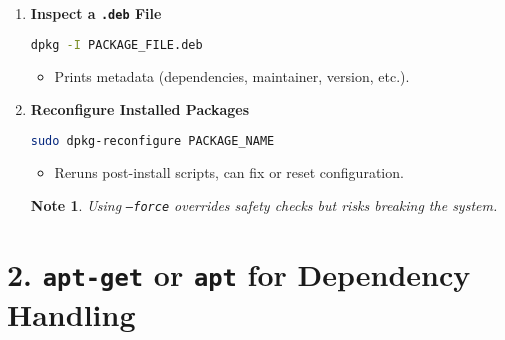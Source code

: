 \documentclass[a4paper]{report}
\newtheorem*{noteenv}{Note}
\begin{document}
\begin{enumerate}
    \item \textbf{Inspect a \texttt{.deb} File}
    \begin{lstlisting}[language=bash]
dpkg -I PACKAGE_FILE.deb
    \end{lstlisting}
    \begin{itemize}
        \item Prints metadata (dependencies, maintainer, version, etc.).
    \end{itemize}

    \item \textbf{Reconfigure Installed Packages}
    \begin{lstlisting}[language=bash]
sudo dpkg-reconfigure PACKAGE_NAME
    \end{lstlisting}
    \begin{itemize}
        \item Reruns post-install scripts, can fix or reset configuration.
    \end{itemize}

    \begin{noteenv}
        Using \texttt{--force} overrides safety checks but risks breaking the system.
    \end{noteenv}

\end{enumerate}

\section*{2. \texttt{apt-get} or \texttt{apt} for Dependency Handling}
\end{document}
